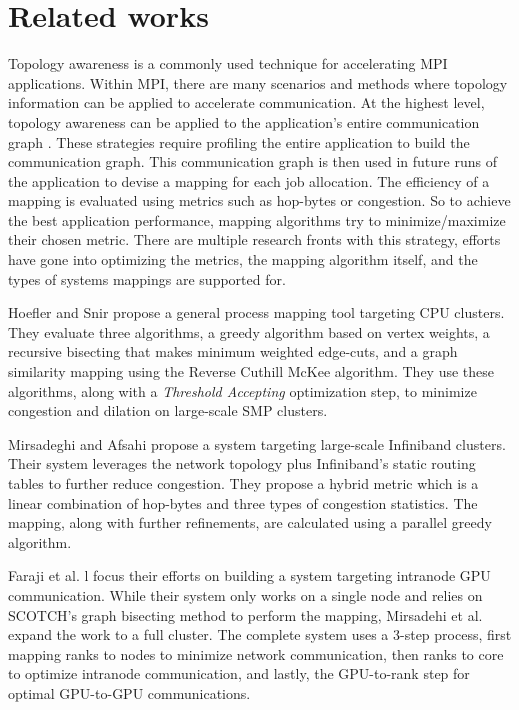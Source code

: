 \section{Related works}
Topology awareness is a commonly used technique for accelerating MPI applications. 
Within MPI, there are many scenarios and methods where topology information can be applied to accelerate communication.
At the highest level, topology awareness can be applied to the application's entire communication graph \cite{Hoefler2011GenericTopoMappingStrats, Mirsadeghi2016PTRAM, Faraji2016TopoAwareGPUSelection, Mirsadeghi2016MAGC, Galvez2017AutoTopoMap}.
These strategies require profiling the entire application to build the communication graph.
This communication graph is then used in future runs of the application to devise a mapping for each job allocation.
The efficiency of a mapping is evaluated using metrics such as hop-bytes or congestion.
So to achieve the best application performance, mapping algorithms try to minimize/maximize their chosen metric.
There are multiple research fronts with this strategy, efforts have gone into optimizing the metrics, the mapping algorithm itself, and the types of systems mappings are supported for.

Hoefler and Snir \cite{Hoefler2011GenericTopoMappingStrats} propose a general process mapping tool targeting CPU clusters.
They evaluate three algorithms, a greedy algorithm based on vertex weights, a recursive bisecting that makes minimum weighted edge-cuts, and a graph similarity mapping using the Reverse Cuthill McKee algorithm. 
They use these algorithms, along with a \textit{Threshold Accepting} optimization step, to minimize congestion and dilation on large-scale SMP clusters.

Mirsadeghi and Afsahi \cite{Mirsadeghi2016PTRAM} propose a system targeting large-scale Infiniband clusters.
Their system leverages the network topology plus Infiniband's static routing tables to further reduce congestion.
They propose a hybrid metric which is a linear combination of hop-bytes and three types of congestion statistics. 
The mapping, along with further refinements, are calculated using a parallel greedy algorithm.

Faraji et al. l \cite{Faraji2016TopoAwareGPUSelection} focus their efforts on building a system targeting intranode GPU communication.
While their system only works on a single node and relies on SCOTCH's \cite{Pellegrini2012SCOTCH} graph bisecting method to perform the mapping, Mirsadehi et al. \cite{Mirsadeghi2016MAGC} expand the work to a full cluster.
The complete system uses a 3-step process, first mapping ranks to nodes to minimize network communication, then ranks to core to optimize intranode communication, and lastly, the GPU-to-rank step for optimal GPU-to-GPU communications.

